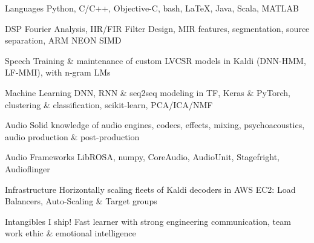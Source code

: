 

\begin{cvskills}

  \cvskill
    {Languages} %
    {Python, C/C++, Objective-C, bash, LaTeX, Java, Scala, MATLAB}

  \cvskill
    {DSP} %
    {Fourier Analysis, IIR/FIR Filter Design, MIR features, segmentation, source separation, ARM NEON SIMD} %
    
  \cvskill
    {Speech} %
    {Training \& maintenance of custom LVCSR models in Kaldi (DNN-HMM, LF-MMI), with n-gram LMs} %

  \cvskill
    {Machine Learning} %
    {DNN, RNN \& seq2seq modeling in TF, Keras \& PyTorch, clustering \& classification, scikit-learn, PCA/ICA/NMF} %
       
  \cvskill
    {Audio} %
    {Solid knowledge of audio engines, codecs, effects, mixing, psychoacoustics, audio production \& post-production } %

  \cvskill
    {Audio Frameworks} %
    {LibROSA, numpy, CoreAudio, AudioUnit, Stagefright, Audioflinger} %

  \cvskill
    {Infrastructure} %
    {Horizontally scaling fleets of Kaldi decoders in AWS EC2: Load Balancers, Auto-Scaling \& Target groups} %

  \cvskill
    {Intangibles} %
    {I ship! Fast learner with strong engineering communication, team work ethic \& emotional intelligence} %



\end{cvskills}

